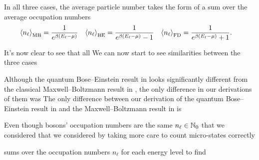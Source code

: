 In all three cases, the average particle number takes the form of a sum over the average occupation numbers
\begin{align*}
  \left\langle n_{\ell} \right\rangle_{\text{MB}} & = \frac{1}{e^{\beta (E_{\ell} - \mu)}} &
  \left\langle n_{\ell} \right\rangle_{\text{BE}} & = \frac{1}{e^{\beta (E_{\ell} - \mu)} - 1} &
  \left\langle n_{\ell} \right\rangle_{\text{FD}} & = \frac{1}{e^{\beta (E_{\ell} - \mu)} + 1}.
\end{align*}

It's now clear to see that all 
We can now start to see similarities between the three cases




Although the quantum Bose--Einstein result in  looks significantly different from the classical Maxwell--Boltzmann result in , the only difference in our derivations of them was 
The only difference between our derivation of the quantum Bose--Einstein result in  and the Maxwell--Boltzmann result in  is 

Even though bosons' occupation numbers are the same $n_{\ell} \in \mathbb N_0$ that we considered 
that we considered 
by taking more care to count micro-states correctly

sums over the occupation numbers $n_{\ell}$ for each energy level to find

